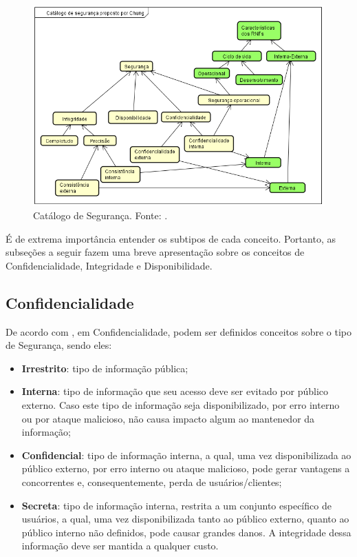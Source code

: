 \begin{figure}[h!]
	\centering
	\includegraphics[keepaspectratio=true,scale=0.9]{figuras/catalogoSegurancaChung.PNG}
	\caption{Catálogo de Segurança. Fonte: \cite{chung2012non}.}
	\label{catalogoSegurancaChung}
\end{figure}

É de extrema importância entender os subtipos de cada conceito. Portanto, as subseções a seguir fazem uma breve apresentação sobre os conceitos de Confidencialidade, Integridade e Disponibilidade. 

\subsection{Confidencialidade}
\label{subsec:confidencialidade}

De acordo com \cite{reis10classificaccao}, em Confidencialidade, podem ser definidos conceitos sobre o tipo de Segurança, sendo eles:

\begin{itemize}
	\item \textbf{Irrestrito}: tipo de informação pública; 
	
	\item \textbf{Interna}: tipo de informação que seu acesso deve ser evitado por público externo. Caso este tipo de informação seja disponibilizado, por erro interno ou por ataque malicioso, não causa impacto algum ao mantenedor da informação;
	
	\item \textbf{Confidencial}: tipo de informação interna, a qual, uma vez disponibilizada ao público externo, por erro interno ou ataque malicioso, pode gerar vantagens a concorrentes e, consequentemente, perda de usuários/clientes; 
	
	\item \textbf{Secreta}: tipo de informação interna, restrita a um conjunto específico de usuários, a qual, uma vez disponibilizada tanto ao público externo, quanto ao público interno não definidos, pode causar grandes danos. A integridade dessa informação deve ser mantida a qualquer custo.
\end{itemize} 

